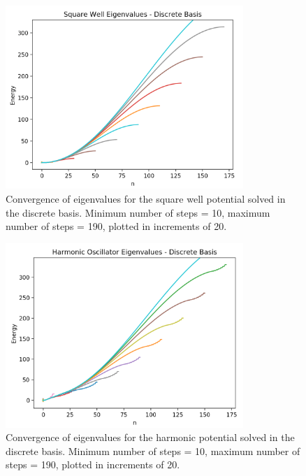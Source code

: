 \documentclass[%
 reprint,
 amsmath,amssymb,
 aps,
]{revtex4-1}
\begin{document}
\begin{figure}
\includegraphics[width=9cm]{DiscreteSquareWellEigenvaluesConvergence}
\caption{Convergence of eigenvalues for the square well potential solved in the discrete basis.  Minimum number of steps = 10, maximum number of steps = 190, plotted in increments of 20.}
\end{figure}
\begin{figure}
\includegraphics[width=9cm]{DiscreteHarmonicOscillatorEigenvaluesConvergence}
\caption{Convergence of eigenvalues for the harmonic potential solved in the discrete basis.  Minimum number of steps = 10, maximum number of steps = 190, plotted in increments of 20.}
\end{figure}
\end{document}
